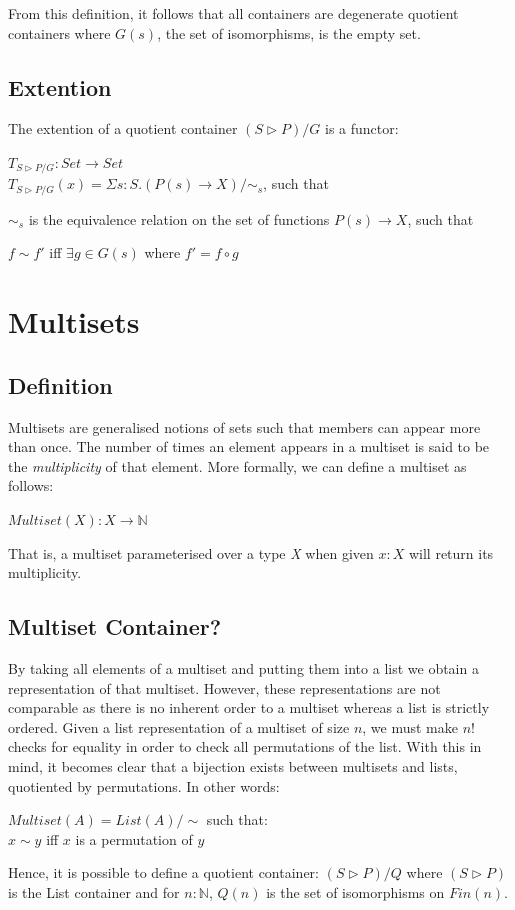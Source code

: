 \documentclass[12pt]{report}
\begin{document}
 From this definition, it follows that all containers are degenerate quotient containers where $G(s)$, the set of isomorphisms, is the empty set. 

\section{Extention}
The extention of a quotient container $(S \rhd P)/G$ is a functor:
\begin{center}
$T_{S \rhd P/G} : Set \rightarrow Set$\\
$T_{S \rhd P/G}(x) = \Sigma s:S.(P(s) \rightarrow X)/\sim_{s}$, such that\\
\end{center}
$\sim_{s}$ is the equivalence relation on the set of functions $P(s) \rightarrow X$, such that
\begin{center}
$f \sim f'$ iff $\exists g \in G(s)$ where $f' = f \circ g$
\end{center}

\chapter{Multisets}
\section{Definition}
Multisets are generalised notions of sets such that members can appear more than once. The number of times an element appears in a multiset is said to be the \textit{multiplicity} of that element. More formally, we can define a multiset as follows:
\begin{center}
$Multiset(X) : X \to \mathbb{N}$ 
\end{center}
That is, a multiset parameterised over a type \textit{X} when given $x:X$ will return its multiplicity. 
\section{Multiset Container?}
By taking all elements of a multiset and putting them into a list we obtain a representation of that multiset. However, these representations are not comparable as there is no inherent order to a multiset whereas a list is strictly ordered. Given a list representation of a multiset of size $n$, we must make $n!$ checks for equality in order to check all permutations of the list. With this in mind, it becomes clear that a bijection exists between multisets and lists, quotiented by permutations. In other words:
\begin{center}
$Multiset(A) = List(A)/\sim$ such that:\\
$x \sim y$ iff $x$ is a permutation of $y$
\end{center}
Hence, it is possible to define a quotient container: $(S \rhd P)/Q$ where $(S \rhd P)$ is the List container and for $n:\mathbb{N}$, $Q(n)$ is the set of isomorphisms on $Fin(n)$.
\end{document}
